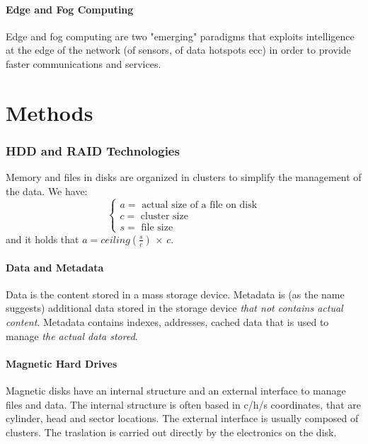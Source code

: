 \documentclass{article}
\begin{document}
			\subsection{Edge and Fog Computing}
				Edge and fog computing are two "emerging" paradigms that exploits intelligence at the edge of the network (of sensors, of data hotspots ecc) in order to provide faster communications and services.
			
	\clearpage \part{Methods}
		\section{HDD and RAID Technologies}
			Memory and files in disks are organized in clusters to simplify the management of the data. We have:
			\begin{equation}
				\begin{cases}
					a = \text{ actual size of a file on disk}\\
					c = \text{ cluster size}\\
					s = \text{ file size}
				\end{cases}
			\end{equation}
			and it holds that $ a = ceiling(\frac{s}{c}) \,\times\, c$.
			
			\subsection{Data and Metadata}
				Data is the content stored in a mass storage device. Metadata is (as the name suggests) additional data stored in the storage device \emph{that not contains actual content}. Metadata contains indexes, addresses, cached data that is used to manage \emph{the actual data stored}.
				
			\subsection{Magnetic Hard Drives}
				Magnetic disks have an internal structure and an external interface to manage files and data. The internal structure is often based in c/h/s coordinates, that are cylinder, head and sector locations. The external interface is usually composed of clusters. The traslation is carried out directly by the electronics on the disk.
				
\end{document}
